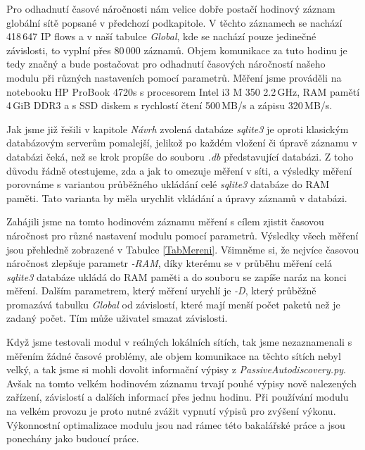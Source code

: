 \documentclass[thesis=B,czech,hidelinks]{FITthesis}[2019/03/21]
\begin{document}
    Pro odhadnutí časové náročnosti nám velice dobře postačí hodinový záznam globální sítě popsané v předchozí podkapitole. V těchto záznamech se nachází 418\,647 IP flows a v naší tabulce \emph{Global}, kde se nachází pouze jedinečné závislosti, to vyplní přes 80\,000 záznamů. Objem komunikace za tuto hodinu je tedy značný a bude postačovat pro odhadnutí časových náročností našeho modulu při různých nastaveních pomocí parametrů. Měření jsme prováděli na notebooku HP ProBook 4720s s procesorem Intel i3 M 350 2.2\,GHz, RAM pamětí 4\,GiB DDR3 a s SSD diskem s rychlostí čtení 	500\,MB/s a zápisu 320\,MB/s. 
    
    Jak jsme již řešili v kapitole \emph{Návrh} zvolená databáze \emph{sqlite3} je oproti klasickým databázovým serverům pomalejší, jelikož po každém vložení či úpravě záznamu v databázi čeká, než se krok propíše do souboru \emph{.db} představující databázi. Z toho důvodu řádně otestujeme, zda a jak to omezuje měření v síti, a výsledky měření porovnáme s variantou průběžného ukládání celé \emph{sqlite3} databáze do RAM paměti. Tato varianta by měla urychlit vkládání a úpravy záznamů v databázi.
    
    Zahájili jsme na tomto hodinovém záznamu měření s cílem zjistit časovou náročnost pro různé nastavení modulu pomocí parametrů. Výsledky všech měření jsou přehledně zobrazené v Tabulce \ref{TabMereni}. Všimněme si, že nejvíce časovou náročnost zlepšuje parametr \emph{-RAM}, díky kterému se v průběhu měření celá \emph{sqlite3} databáze ukládá do RAM paměti a do souboru se zapíše naráz na konci měření. Dalším parametrem, který měření urychlí je \emph{-D}, který průběžně promazává tabulku \emph{Global} od závislostí, které mají menší počet paketů než je zadaný počet. Tím může uživatel smazat  závislosti.
    
    Když jsme testovali modul v reálných lokálních sítích, tak jsme nezaznamenali s měřením žádné časové problémy, ale objem komunikace na těchto sítích nebyl velký, a tak jsme si mohli dovolit informační výpisy z \emph{PassiveAutodiscovery.py}. Avšak na tomto velkém hodinovém záznamu trvají pouhé výpisy nově nalezených zařízení, závislostí a dalších informací přes jednu hodinu. Při používání modulu na velkém provozu je proto nutné zvážit vypnutí výpisů pro zvýšení výkonu. Výkonnostní optimalizace modulu jsou nad rámec této bakalářské práce a jsou ponechány jako budoucí práce. 
    
\end{document}
